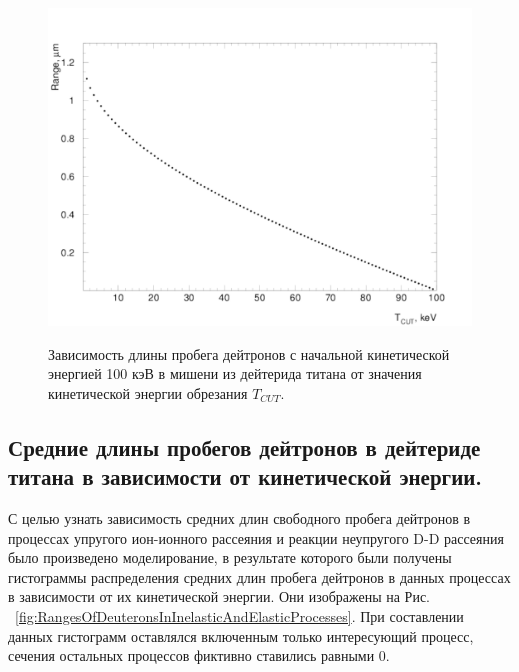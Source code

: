 \documentclass[a4paper,12pt]{article}
\begin{document}
\begin{large}
\begin{figure}[ht]
  {
     \includegraphics[width=0.99\linewidth]{images/ranges.pdf}
  }
  \caption{Зависимость длины пробега дейтронов с начальной кинетической энергией 100 кэВ в мишени из дейтерида титана от значения кинетической энергии обрезания $T_{CUT}$.}
  \label{fig:RangesOfDeuteronsInTiD2}
\end{figure}

\subsection{Средние длины пробегов дейтронов в дейтериде титана в зависимости от кинетической энергии.}
\label{DeuteronMeanRangesDependenceOnEnergyInTiD2}

	С целью узнать зависимость средних длин свободного пробега дейтронов в процессах упругого ион-ионного рассеяния и реакции неупругого D-D рассеяния было произведено моделирование, в результате которого были получены гистограммы распределения средних длин пробега дейтронов в данных процессах в зависимости от их кинетической энергии.
	Они изображены на Рис. ~\ref{fig:RangesOfDeuteronsInInelasticAndElasticProcesses}.
	При составлении данных гистограмм оставлялся включенным только интересующий процесс, сечения остальных процессов фиктивно ставились равными 0.  
	

\end{large}
\end{document}
